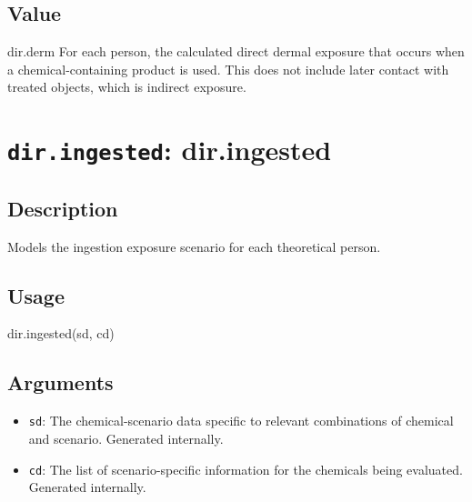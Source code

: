 \documentclass[
]{article}
\newenvironment{Shaded}{\begin{snugshade}}{\end{snugshade}}
\newcommand{\FunctionTok}[1]{\textcolor[rgb]{0.00,0.00,0.00}{#1}}
\newcommand{\NormalTok}[1]{#1}
\providecommand{\tightlist}{%
  \setlength{\itemsep}{0pt}\setlength{\parskip}{0pt}}
\begin{document}
\hypertarget{value-9}{%
\subsection{Value}\label{value-9}}

dir.derm For each person, the calculated direct dermal exposure that
occurs when a chemical-containing product is used. This does not include
later contact with treated objects, which is indirect exposure.

\hypertarget{dir.ingested-dir.ingested}{%
\section{\texorpdfstring{\texttt{dir.ingested}:
dir.ingested}{dir.ingested: dir.ingested}}\label{dir.ingested-dir.ingested}}

\hypertarget{description-14}{%
\subsection{Description}\label{description-14}}

Models the ingestion exposure scenario for each theoretical person.

\hypertarget{usage-14}{%
\subsection{Usage}\label{usage-14}}

\begin{Shaded}
\begin{Highlighting}[]
\FunctionTok{dir.ingested}\NormalTok{(sd, cd)}
\end{Highlighting}
\end{Shaded}

\hypertarget{arguments-11}{%
\subsection{Arguments}\label{arguments-11}}

\begin{itemize}
\tightlist
\item
  \texttt{sd}: The chemical-scenario data specific to relevant
  combinations of chemical and scenario. Generated internally.
\item
  \texttt{cd}: The list of scenario-specific information for the
  chemicals being evaluated. Generated internally.
\end{itemize}
\end{document}
